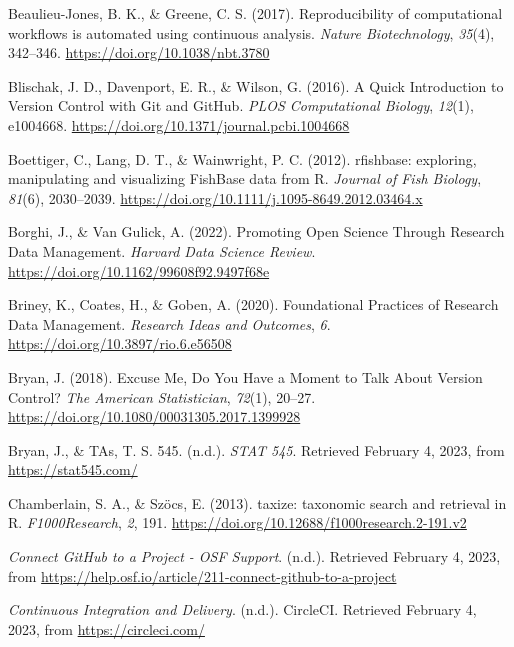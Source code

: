 \begin{CSLReferences}{1}{0}
\leavevmode{}%
Beaulieu-Jones, B. K., \& Greene, C. S. (2017). Reproducibility of computational workflows is automated using continuous analysis. \emph{Nature Biotechnology}, \emph{35}(4), 342--346. \url{https://doi.org/10.1038/nbt.3780}

\leavevmode{}%
Blischak, J. D., Davenport, E. R., \& Wilson, G. (2016). A Quick Introduction to Version Control with Git and GitHub. \emph{PLOS Computational Biology}, \emph{12}(1), e1004668. \url{https://doi.org/10.1371/journal.pcbi.1004668}

\leavevmode{}%
Boettiger, C., Lang, D. T., \& Wainwright, P. C. (2012). rfishbase: exploring, manipulating and visualizing FishBase data from R. \emph{Journal of Fish Biology}, \emph{81}(6), 2030--2039. \url{https://doi.org/10.1111/j.1095-8649.2012.03464.x}

\leavevmode{}%
Borghi, J., \& Van Gulick, A. (2022). Promoting Open Science Through Research Data Management. \emph{Harvard Data Science Review}. \url{https://doi.org/10.1162/99608f92.9497f68e}

\leavevmode{}%
Briney, K., Coates, H., \& Goben, A. (2020). Foundational Practices of Research Data Management. \emph{Research Ideas and Outcomes}, \emph{6}. \url{https://doi.org/10.3897/rio.6.e56508}

\leavevmode{}%
Bryan, J. (2018). Excuse Me, Do You Have a Moment to Talk About Version Control? \emph{The American Statistician}, \emph{72}(1), 20--27. \url{https://doi.org/10.1080/00031305.2017.1399928}

\leavevmode{}%
Bryan, J., \& TAs, T. S. 545. (n.d.). \emph{STAT 545}. Retrieved February 4, 2023, from \url{https://stat545.com/}

\leavevmode{}%
Chamberlain, S. A., \& Szöcs, E. (2013). taxize: taxonomic search and retrieval in R. \emph{F1000Research}, \emph{2}, 191. \url{https://doi.org/10.12688/f1000research.2-191.v2}

\leavevmode{}%
\emph{Connect GitHub to a Project - OSF Support}. (n.d.). Retrieved February 4, 2023, from \url{https://help.osf.io/article/211-connect-github-to-a-project}

\leavevmode{}%
\emph{Continuous Integration and Delivery}. (n.d.). CircleCI. Retrieved February 4, 2023, from \url{https://circleci.com/}


\end{CSLReferences}
